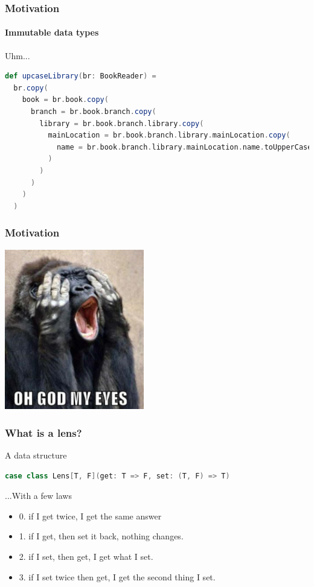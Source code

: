 \documentclass{beamer}
\begin{document}
\begin{frame}[fragile]
  \frametitle{Motivation}
  \framesubtitle{Immutable data types}
  \begin{block}{Uhm...}
    \begin{lstlisting}[language=scala]
def upcaseLibrary(br: BookReader) =
  br.copy(
    book = br.book.copy(
      branch = br.book.branch.copy(
        library = br.book.branch.library.copy(
          mainLocation = br.book.branch.library.mainLocation.copy(
            name = br.book.branch.library.mainLocation.name.toUpperCase
          )
        )
      )
    )
  )
    \end{lstlisting}
  \end{block}
\end{frame}

\begin{frame}[fragile]
  \frametitle{Motivation}
  \begin{center}
    \includegraphics[height=7cm]{img/ohgodmyeyes.png}
  \end{center}
\end{frame}

\begin{frame}[fragile]
  \frametitle{What is a lens?}
  \begin{block}{A data structure}
    \begin{lstlisting}[language=scala]
case class Lens[T, F](get: T => F, set: (T, F) => T)
    \end{lstlisting}
  \end{block}

  \begin{block}{...With a few laws}
    \begin{itemize}
      \item 0. if I get twice, I get the same answer
      \item 1. if I get, then set it back, nothing changes.
      \item 2. if I set, then get, I get what I set.
      \item 3. if I set twice then get, I get the second thing I set.
    \end{itemize}
  \end{block}
\end{frame}
\end{document}

